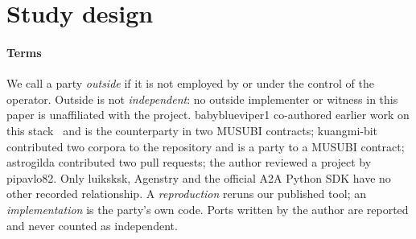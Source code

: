 \documentclass[preprint,12pt,authoryear]{elsarticle}
\begin{document}
\section{Study design}\label{sec:design}

\paragraph{Terms} We call a party \emph{outside} if it is not employed by or under the control of the operator. Outside is not \emph{independent}: no outside implementer or witness in this paper is unaffiliated with the project. babyblueviper1 co-authored earlier work on this stack~\citep{ssrn7419998} and is the counterparty in two MUSUBI contracts; kuangmi-bit contributed two corpora to the repository and is a party to a MUSUBI contract; astrogilda contributed two pull requests; the author reviewed a project by pipavlo82. Only luiksksk, Agenstry and the official A2A Python SDK have no other recorded relationship. A \emph{reproduction} reruns our published tool; an \emph{implementation} is the party's own code. Ports written by the author are reported and never counted as independent.
\end{document}
